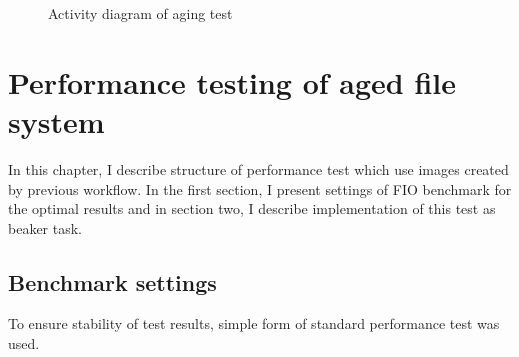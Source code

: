 \documentclass[
  color, %
  table, %
  lof,   %
  lot,   %
]{fithesis3}
\begin{document}
\begin{figure}[ht]
    \centering
    \caption{Activity diagram of aging test}
    \label{fig:drift_job_activity}
\end{figure}

\chapter{Performance testing of aged file system}
In this chapter, I describe structure of performance test which use images created by previous workflow. In the first section, I present settings of FIO benchmark for the optimal results and in section two, I describe implementation of this test as beaker task.

\section{Benchmark settings}
To ensure stability of test results, simple form of standard performance test was used.
\end{document}
